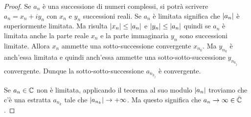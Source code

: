\begin{proof}
\begin{comment}
Si può procedere così all'infinito (formalmente: tramite una definizione per induzione)
e ottenere quindi le successioni $A_k$, $B_k$ e $n_k$ che soddisfano le seguenti proprietà (da verificare con il principio di induzione):
\begin{enumerate}
\item $A_k$ è crescente, $B_k$ è decrescente, $A_k \le B_k$;
\item $B_k - A_k = (B_0-A_0)/2^k$;
\item $a_{n_k} \in [A_k, B_k]$.
\end{enumerate}

Essendo $A_k$ monotona sappiamo che esiste $\ell = \lim A_k$. Essendo poi $A_0 \le A_k \le B_k \le B_0$ sappiamo che $A_k$ è limitata, quindi $\ell$ è finito.
Inoltre
\[
 \lim B_k = \lim A_k + \frac{B_0-A_0}{2^k} = \lim A_k = \ell
 \]
 e dunque
passando al limite nelle disuguaglianze
\[
   A_k \le a_{n_k} \le B_k
\]
si ottiene (teorema dei carabinieri)
\[
  a_{n_k} \to \ell.
\]
Questo conclude la dimostrazione per le successioni reali.
\end{comment}

Se $a_n$ è una successione di numeri complessi, si potrà scrivere
$a_n = x_n + i y_n$ con
$x_n$ e $y_n$ successioni reali. Se $a_n$ è limitata significa che ${\left|a_n\right|}$
è superiormente limitata. Ma risulta ${\left|x_n\right|} \le {\left|a_n\right|}$ e
${\left|y_n\right|}\le {\left|a_n\right|}$ quindi se $a_n$ è limitata anche la parte reale
$x_n$ e la parte immaginaria $y_n$ sono successioni limitate.
Allora $x_n$ ammette una sotto-successione convergente $x_{n_k}$.
Ma $y_{n_k}$ è anch'essa limitata e quindi anch'essa ammette una
sotto-sotto-successione $y_{n_{k_j}}$ convergente.
Dunque la sotto-sotto-successione $a_{n_{k_j}}$ è convergente.

Se $a_n\in {\mathbb C}$ non è limitata, applicando il teorema al suo modulo ${\left|a_n\right|}$
troviamo che c'è una estratta $a_{n_k}$ tale che ${\left|a_{n_k}\right|}\to +\infty$.
Ma questo significa che $a_n\to \infty \in \bar {{\mathbb C}}$.
\end{proof}

